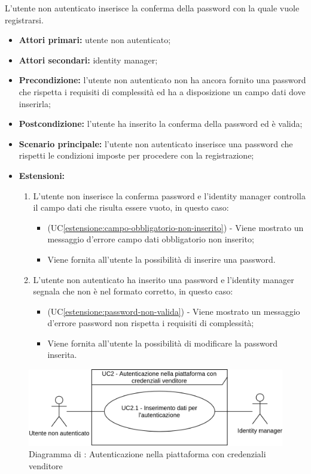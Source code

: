 L'utente non autenticato inserisce la conferma della password con la quale vuole registrarsi.
\begin{itemize}
	\item \textbf{Attori primari:} utente non autenticato;
	\item \textbf{Attori secondari:} identity manager;
	\item \textbf{Precondizione:} l'utente non autenticato non ha ancora fornito una password che rispetta i requisiti di complessità ed ha a disposizione un campo dati dove inserirla;
	\item \textbf{Postcondizione:} l'utente ha inserito la conferma della password ed è valida;
	\item \textbf{Scenario principale:} l'utente non autenticato inserisce una password che rispetti le condizioni imposte per procedere con la registrazione;
	\item \textbf{Estensioni:} 
	\begin{enumerate}[label=\lett]
		\item L'utente non inserisce la conferma password e l'identity manager controlla il campo dati che risulta essere vuoto, in questo caso:
		\begin{itemize}
			\item (UC\ref{estensione:campo-obbligatorio-non-inserito}) - Viene mostrato un messaggio d'errore campo dati obbligatorio non inserito;
			\item Viene fornita all'utente la possibilità di inserire una password.
		\end{itemize}
		\item L'utente non autenticato ha inserito una password e l'identity manager segnala che non è nel formato corretto, in questo caso:
		\begin{itemize}
			\item (UC\ref{estensione:password-non-valida}) - Viene mostrato un messaggio d'errore password non rispetta i requisiti di complessità;
			\item Viene fornita all'utente la possibilità di modificare la password inserita.
		\end{itemize}
	\end{enumerate} 
\end{itemize}

\label{autenticazione-venditore}

\begin{figure}[H]
    \centering
    \includegraphics[scale=1]{Immagini/DiagrammiUC/AccessoAllaPiattaforma/AutenticazioneVenditore.png}
    \caption{Diagramma di \actualUC: Autenticazione nella piattaforma con credenziali venditore} 
    \label{fig:autenticazione-venditore}
\end{figure}

